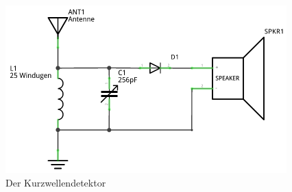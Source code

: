 
\begin{figure}[H]
    \centering
    \includegraphics[scale=0.9]{Kurzwellendetektor/Bilder/Kurzwellendetektor_Schaltplan.pdf}
    \caption{Der Kurzwellendetektor}
    \label{kd}
\end{figure}
